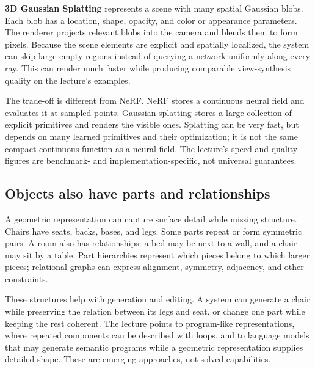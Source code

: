 \hypertarget{04-visual-computing-ii-ch034-gaussian-splatting-trades-dense-queries-for-explicit-scene-elements}{}

\textbf{3D Gaussian Splatting} represents a scene with many spatial Gaussian blobs. Each blob has a location, shape, opacity, and color or appearance parameters. The renderer projects relevant blobs into the camera and blends them to form pixels. Because the scene elements are explicit and spatially localized, the system can skip large empty regions instead of querying a network uniformly along every ray. This can render much faster while producing comparable view-synthesis quality on the lecture's examples.

The trade-off is different from NeRF. NeRF stores a continuous neural field and evaluates it at sampled points. Gaussian splatting stores a large collection of explicit primitives and renders the visible ones. Splatting can be very fast, but depends on many learned primitives and their optimization; it is not the same compact continuous function as a neural field. The lecture's speed and quality figures are benchmark- and implementation-specific, not universal guarantees.

\subsection{Objects also have parts and relationships}\label{04-visual-computing-ii-ch034-objects-also-have-parts-and-relationships}

\hypertarget{04-visual-computing-ii-ch034-objects-also-have-parts-and-relationships}{}

A geometric representation can capture surface detail while missing structure. Chairs have seats, backs, bases, and legs. Some parts repeat or form symmetric pairs. A room also has relationships: a bed may be next to a wall, and a chair may sit by a table. Part hierarchies represent which pieces belong to which larger pieces; relational graphs can express alignment, symmetry, adjacency, and other constraints.

These structures help with generation and editing. A system can generate a chair while preserving the relation between its legs and seat, or change one part while keeping the rest coherent. The lecture points to program-like representations, where repeated components can be described with loops, and to language models that may generate semantic programs while a geometric representation supplies detailed shape. These are emerging approaches, not solved capabilities.

